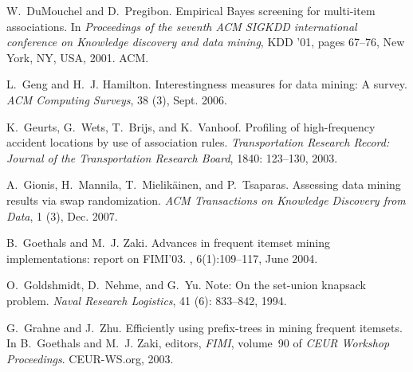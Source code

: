 \begin{thebibliography}{42}
W.~DuMouchel and D.~Pregibon.
\newblock Empirical {B}ayes screening for multi-item associations.
\newblock In \emph{Proceedings of the seventh ACM SIGKDD international
  conference on Knowledge discovery and data mining}, KDD '01, pages 67--76,
  New York, NY, USA, 2001. ACM.

L.~Geng and H.~J. Hamilton.
\newblock Interestingness measures for data mining: A survey.
\newblock \emph{ACM Computing Surveys}, 38 (3), Sept. 2006.

K.~Geurts, G.~Wets, T.~Brijs, and K.~Vanhoof.
\newblock Profiling of high-frequency accident locations by use of association
  rules.
\newblock \emph{Transportation Research Record: Journal of the Transportation
  Research Board}, 1840: 123--130, 2003.

A.~Gionis, H.~Mannila, T.~Mielik\"{a}inen, and P.~Tsaparas.
\newblock Assessing data mining results via swap randomization.
\newblock \emph{ACM Transactions on Knowledge Discovery from Data}, 1
  (3), Dec. 2007.

B.~Goethals and M.~J. Zaki.
\newblock Advances in frequent itemset mining implementations: report on
  FIMI'03.
, 6(1):109--117, June 2004.

O.~Goldshmidt, D.~Nehme, and G.~Yu.
\newblock Note: On the set-union knapsack problem.
\newblock \emph{Naval Research Logistics}, 41 (6): 833--842,
  1994.

G.~Grahne and J.~Zhu.
\newblock Efficiently using prefix-trees in mining frequent itemsets.
\newblock In B.~Goethals and M.~J. Zaki, editors, \emph{FIMI}, volume~90 of
  \emph{CEUR Workshop Proceedings}. CEUR-WS.org, 2003.


\end{thebibliography}
